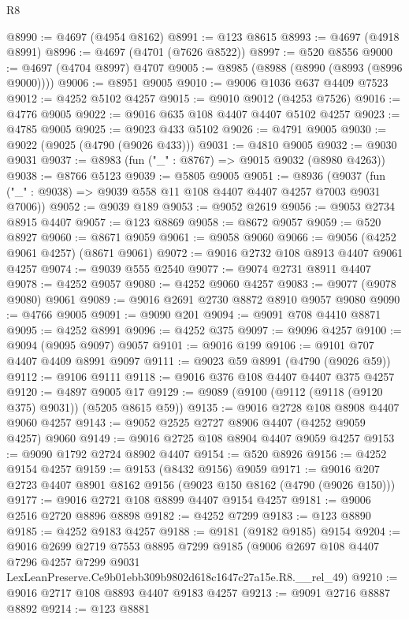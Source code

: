 \begin{lexlean}{R8}
\begin{coremodule}
@8990 := @4697 (@4954 @8162)
@8991 := @123 @8615
@8993 := @4697 (@4918 @8991)
@8996 := @4697 (@4701 (@7626 @8522))
@8997 := @520 @8556
@9000 := @4697 (@4704 @8997) @4707
@9005 := @8985 (@8988 (@8990 (@8993 (@8996 @9000))))
@9006 := @8951 @9005
@9010 := @9006 @1036 @637 @4409 @7523
@9012 := @4252 @5102 @4257
@9015 := @9010 @9012 (@4253 @7526)
@9016 := @4776 @9005
@9022 := @9016 @635 @108 @4407 @4407 @5102 @4257
@9023 := @4785 @9005
@9025 := @9023 @433 @5102
@9026 := @4791 @9005
@9030 := @9022 (@9025 (@4790 (@9026 @433)))
@9031 := @4810 @9005
@9032 := @9030 @9031
@9037 := @8983 (fun ("_" : @8767) => @9015 @9032 (@8980 @4263))
@9038 := @8766 @5123
@9039 := @5805 @9005
@9051 := @8936
    (@9037 (fun ("_" : @9038) => @9039 @558 @11 @108 @4407 @4407 @4257 @7003 @9031 @7006))
@9052 := @9039 @189
@9053 := @9052 @2619
@9056 := @9053 @2734 @8915 @4407
@9057 := @123 @8869
@9058 := @8672 @9057
@9059 := @520 @8927
@9060 := @8671 @9059
@9061 := @9058 @9060
@9066 := @9056 (@4252 @9061 @4257) (@8671 @9061)
@9072 := @9016 @2732 @108 @8913 @4407 @9061 @4257
@9074 := @9039 @555 @2540
@9077 := @9074 @2731 @8911 @4407
@9078 := @4252 @9057
@9080 := @4252 @9060 @4257
@9083 := @9077 (@9078 @9080) @9061
@9089 := @9016 @2691 @2730 @8872 @8910 @9057 @9080
@9090 := @4766 @9005
@9091 := @9090 @201
@9094 := @9091 @708 @4410 @8871
@9095 := @4252 @8991
@9096 := @4252 @375
@9097 := @9096 @4257
@9100 := @9094 (@9095 @9097) @9057
@9101 := @9016 @199
@9106 := @9101 @707 @4407 @4409 @8991 @9097
@9111 := @9023 @59 @8991 (@4790 (@9026 @59))
@9112 := @9106 @9111
@9118 := @9016 @376 @108 @4407 @4407 @375 @4257
@9120 := @4897 @9005 @17
@9129 := @9089 (@9100 (@9112 (@9118 (@9120 @375) @9031)) (@5205 @8615 @59))
@9135 := @9016 @2728 @108 @8908 @4407 @9060 @4257
@9143 := @9052 @2525 @2727 @8906 @4407 (@4252 @9059 @4257) @9060
@9149 := @9016 @2725 @108 @8904 @4407 @9059 @4257
@9153 := @9090 @1792 @2724 @8902 @4407
@9154 := @520 @8926
@9156 := @4252 @9154 @4257
@9159 := @9153 (@8432 @9156) @9059
@9171 := @9016 @207 @2723 @4407 @8901 @8162 @9156 (@9023 @150 @8162 (@4790 (@9026 @150)))
@9177 := @9016 @2721 @108 @8899 @4407 @9154 @4257
@9181 := @9006 @2516 @2720 @8896 @8898
@9182 := @4252 @7299
@9183 := @123 @8890
@9185 := @4252 @9183 @4257
@9188 := @9181 (@9182 @9185) @9154
@9204 := @9016
    @2699
    @2719
    @7553
    @8895
    @7299
    @9185
    (@9006
      @2697
      @108
      @4407
      @7296
      @4257
      @7299
      @9031
      LexLeanPreserve.Ce9b01ebb309b9802d618c1647c27a15e.R8.__rel_49)
@9210 := @9016 @2717 @108 @8893 @4407 @9183 @4257
@9213 := @9091 @2716 @8887 @8892
@9214 := @123 @8881

\end{coremodule}
\end{lexlean}

